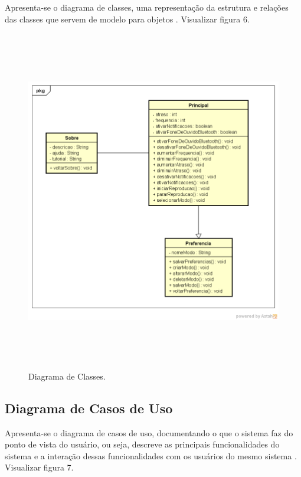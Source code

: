 Apresenta-se o diagrama de classes, uma representa\c{c}\~ao da estrutura e rela\c{c}\~oes das classes que servem de modelo para objetos \cite{Tybel2017}. Visualizar figura 6. 
\begin{figure}[H]
	\centering
	\caption[Diagrama de Classes]{Diagrama de Classes. \label{fig:diagramadeclasses}}
	\includegraphics[height=15cm]{./Figuras/class_diagram.png}%
\end{figure}

\subsection{Diagrama de Casos de Uso}

Apresenta-se o diagrama de casos de uso, documentando o que o sistema faz do ponto de vista do usu\'ario, ou seja, descreve as principais funcionalidades do sistema e a intera\c{c}\~ao dessas funcionalidades com os usu\'arios do mesmo sistema \cite{Ribeiro2012}. Visualizar figura 7. 

